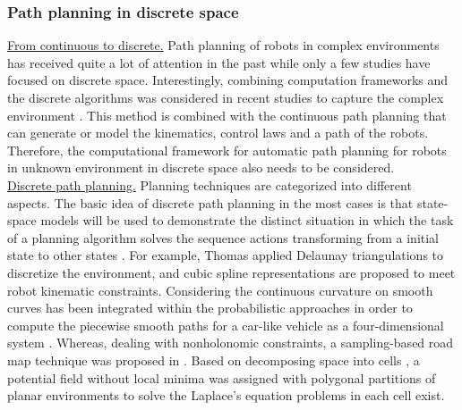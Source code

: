 \subsubsection{Path planning in discrete space}
\noindent\uline{From continuous to discrete.} Path planning of robots in complex environments has received quite a lot of attention in the past while only a few studies have focused on discrete space. Interestingly, combining computation frameworks and the discrete algorithms was considered in recent studies to capture the complex environment \citep*{Belta_2005_Discrete_MP}. 
This method is combined with the continuous path planning \cite{Mitchell03_ContinuousPathPlanning} that can generate or model the kinematics, control laws and a path of the robots. Therefore, the computational framework for automatic path planning for robots in unknown environment in discrete space also needs to be considered.\\




\noindent\uline{Discrete path planning.} Planning techniques are categorized into different aspects. The basic idea of discrete path planning in the most cases is that state-space models will be used to demonstrate the distinct situation in which the task of a planning algorithm solves the sequence actions transforming from a initial state to other states \cite{LaValle06_PlanningAlgorithm}.
For example, Thomas \citep*{Thomas_2003_Trajectory} applied Delaunay triangulations to discretize the environment, and cubic spline representations are proposed to meet robot kinematic constraints.
Considering the continuous curvature on smooth curves has been integrated within the probabilistic approaches in order to compute the piecewise smooth paths for a car-like vehicle as a four-dimensional system \citep*{Lamiraux_2001_Smooth_MP}. Whereas, dealing with nonholonomic constraints, a sampling-based road map technique was proposed in \citep*{Cheng_2001_RRT_trajectory}. Based on decomposing space into cells \citep*{Conner_2003_Potential_Func}, a potential field without local minima was assigned with polygonal partitions of planar environments to solve the Laplace's equation problems in each cell exist.\\



